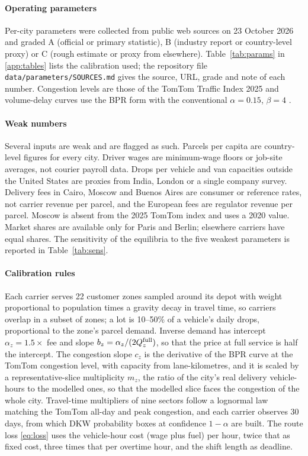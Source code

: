 \documentclass[preprint,12pt]{elsarticle}
\theoremstyle{definition}
\theoremstyle{remark}
\begin{document}
\paragraph{Operating parameters} Per-city parameters were collected from public web sources on 23 October 2026 and graded A (official or primary statistic), B (industry report or country-level proxy) or C (rough estimate or proxy from elsewhere). Table~\ref{tab:params} in \ref{app:tables} lists the calibration used; the repository file \texttt{data/parameters/SOURCES.md} gives the source, URL, grade and note of each number. Congestion levels are those of the TomTom Traffic Index 2025 \citep{TomTom2025} and volume-delay curves use the BPR form with the conventional $\alpha=0.15$, $\beta=4$ \citep{BPR1964}.

\paragraph{Weak numbers} Several inputs are weak and are flagged as such. Parcels per capita are country-level figures for every city. Driver wages are minimum-wage floors or job-site averages, not courier payroll data. Drops per vehicle and van capacities outside the United States are proxies from India, London or a single company survey. Delivery fees in Cairo, Moscow and Buenos Aires are consumer or reference rates, not carrier revenue per parcel, and the European fees are regulator revenue per parcel. Moscow is absent from the 2025 TomTom index and uses a 2020 value. Market shares are available only for Paris and Berlin; elsewhere carriers have equal shares. The sensitivity of the equilibria to the five weakest parameters is reported in Table~\ref{tab:sens}.

\paragraph{Calibration rules} Each carrier serves 22 customer zones sampled around its depot with weight proportional to population times a gravity decay in travel time, so carriers overlap in a subset of zones; a lot is 10--50\% of a vehicle's daily drops, proportional to the zone's parcel demand. Inverse demand has intercept $\alpha_z=1.5\times$ fee and slope $b_z=\alpha_z/(2Q_z^{\rm full})$, so that the price at full service is half the intercept. The congestion slope $c_z$ is the derivative of the BPR curve at the TomTom congestion level, with capacity from lane-kilometres, and it is scaled by a representative-slice multiplicity $m_z$, the ratio of the city's real delivery vehicle-hours to the modelled ones, so that the modelled slice faces the congestion of the whole city. Travel-time multipliers of nine sectors follow a lognormal law matching the TomTom all-day and peak congestion, and each carrier observes 30 days, from which DKW probability boxes at confidence $1-\alpha$ are built. The route loss \eqref{eq:loss} uses the vehicle-hour cost (wage plus fuel) per hour, twice that as fixed cost, three times that per overtime hour, and the shift length as deadline.
\end{document}
